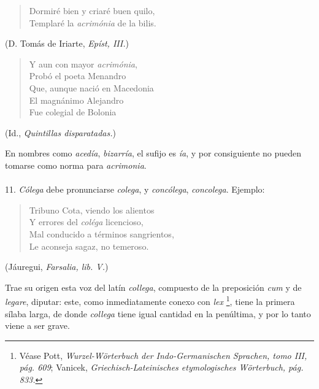 \documentclass{article}
\begin{document}
\small

\begin{verse}
Dormiré bien y criaré buen quilo, \\
Templaré la \emph{acrimónia} de la bilis.
\end{verse}
\begin{flushright}
(D. Tomás de Iriarte, \emph{Epíst, III.})
\end{flushright}

\begin{verse}
Y aun con mayor \emph{acrimónia}, \\
Probó el poeta Menandro \\
Que, aunque nació en Macedonia \\
El magnánimo Alejandro \\
Fue colegial de Bolonia
\end{verse}
\begin{flushright}
(Id., \emph{Quintillas disparatadas.})
\end{flushright}

En nombres como \emph{acedía}, \emph{bizarría}, el sufijo es \emph{ía}, y por consiguiente no pueden tomarse
como norma para \emph{acrimonia}.

\paragraph{} 11. \emph{Cólega} debe pronunciarse \emph{colega}, y \emph{concólega}, \emph{concolega}.
Ejemplo:

\begin{verse}
Tribuno Cota, viendo los alientos \\
Y errores del \emph{coléga} licencioso, \\
Mal conducido a términos sangrientos, \\
Le aconseja sagaz, no temeroso.
\end{verse}
\begin{flushright}
(Jáuregui, \emph{Farsalia, lib. V.})
\end{flushright}

Trae su origen esta voz del latín \emph{collega}, compuesto de la preposición \emph{cum} y de \emph{legare},
diputar: este, como inmediatamente conexo con \emph{lex} 
\footnote{Véase Pott, \emph{Wurzel-Wörterbuch der Indo-Germanischen Sprachen, tomo III, pág. 609}; Vanicek,
\emph{Griechisch-Lateinisches etymologisches Wörterbuch, pág. 833.}}, 
tiene la primera sílaba larga, de donde \emph{collega} tiene igual cantidad en la penúltima, y por lo tanto 
viene a ser grave.
\end{document}
